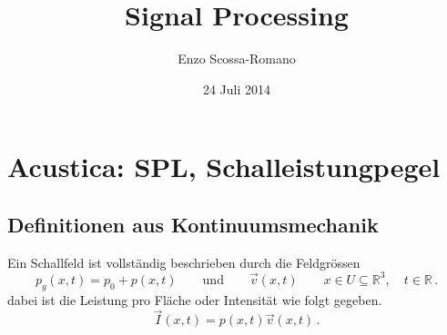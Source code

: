 \documentclass[11pt,a4paper,DIV12,BCOR1.5mm]{scrartcl}
\author{Enzo Scossa-Romano}
\date{24 Juli 2014}
\title{Signal Processing}
\begin{document}
\maketitle
\tableofcontents
\section{Acustica: SPL, Schalleistungpegel }
\subsection{Definitionen aus Kontinuumsmechanik}
Ein Schallfeld ist vollständig beschrieben durch die Feldgrössen
\begin{equation}
	 	p_g(x,t)=p_0+p(x,t)\qquad \text{und}\qquad \vec v(x,t) \qquad x\in  U \subseteq\mathbb{R}^3,\quad t\in  \mathbb{R}\,.
\end{equation}
dabei ist die Leistung pro Fläche oder Intensität wie folgt gegeben. 
\begin{equation}
\vec I(x,t)=p(x,t)\vec v(x,t)\,.
\end{equation}
\end{document}
